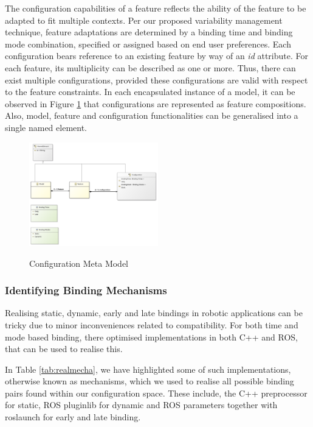 \documentclass[conference]{IEEEtran}
\begin{document}
The configuration capabilities of a feature reflects the ability of the feature to be adapted to fit multiple contexts. Per our proposed variability management technique,
feature adaptations are determined by a binding time and binding mode combination, specified or assigned based on end user preferences. Each configuration bears reference to an existing feature by way of an \textit{id} attribute. For each feature, its multiplicity can be described as one or more. Thus, there can exist multiple configurations, provided these configurations are valid with respect to the feature constraints. In each encapsulated instance of a model, it can be observed in Figure \ref{conmet} that configurations are represented as feature compositions. Also, model, feature and configuration functionalities can be generalised into a single named element. 

\begin{figure}[H]
\caption{Configuration Meta Model}
\centering
\includegraphics[width=0.5\textwidth]{diagrams/config.png}
\label{conmet}
\end{figure}

\subsubsection{Identifying Binding Mechanisms}
Realising static, dynamic, early and late bindings in robotic applications can be tricky due to minor inconveniences related to compatibility. For both time and mode based binding, there optimised implementations in both C++ and ROS, that can be used to realise this.

In Table \ref{tab:realmecha}, we have highlighted some of such implementations, otherwise known as mechanisms, which we used to realise all possible binding pairs found within our configuration space. These include, the C++ preprocessor for static, ROS pluginlib for dynamic and ROS parameters together with roslaunch for early and late binding.
\end{document}
